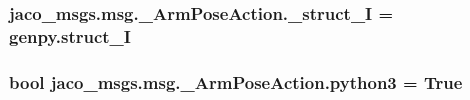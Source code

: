 \subsubsection[{\texorpdfstring{\+\_\+struct\+\_\+I}{_struct_I}}]{\setlength{\rightskip}{0pt plus 5cm}jaco\+\_\+msgs.\+msg.\+\_\+\+Arm\+Pose\+Action.\+\_\+struct\+\_\+I = genpy.\+struct\+\_\+I\hspace{0.3cm}{\ttfamily [private]}}\hypertarget{namespacejaco__msgs_1_1msg_1_1__ArmPoseAction_af2bc9f79d3d398623852812391777c44}{}\label{namespacejaco__msgs_1_1msg_1_1__ArmPoseAction_af2bc9f79d3d398623852812391777c44}
\subsubsection[{\texorpdfstring{python3}{python3}}]{\setlength{\rightskip}{0pt plus 5cm}bool jaco\+\_\+msgs.\+msg.\+\_\+\+Arm\+Pose\+Action.\+python3 = True}\hypertarget{namespacejaco__msgs_1_1msg_1_1__ArmPoseAction_ad4725f5a042ab6c2532efc8548b24535}{}\label{namespacejaco__msgs_1_1msg_1_1__ArmPoseAction_ad4725f5a042ab6c2532efc8548b24535}
